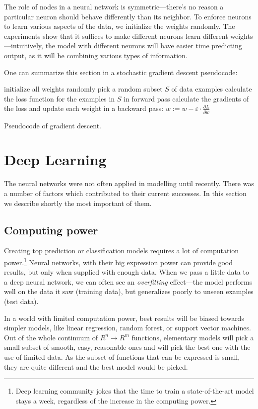 The role of nodes in a neural network is symmetric---there's no reason a particular neuron should behave differently than its neighbor. To enforce neurons to learn various aspects of the data, we initialize the weights randomly. The experiments show that it suffices to make different neurons learn different weights---intuitively, the model with different neurons will have easier time predicting output, as it will be combining various types of information.

One can summarize this section in a stochastic gradient descent pseudocode:
\begin{algorithm} \label{sgd-pseudo}
  initialize all weights randomly\;
   {
    pick a random subset $S$ of data examples\;
    calculate the loss function for the examples in $S$ in forward pass\;
    calculate the gradients of the loss and update each weight in a backward pass:
    $w := w - \varepsilon \cdot \frac{\partial L}{\partial w}$
  }
  \caption{Pseudocode of gradient descent.}
\end{algorithm}

\section{Deep Learning}
The neural networks were not often applied in modelling until recently. There was a number of factors which contributed to their current successes. In this section we describe shortly the most important of them.

\subsection{Computing power}
Creating top prediction or classification models requires a lot of computation power.\footnote{Deep learning community jokes that the time to train a state-of-the-art model stays a week, regardless of the increase in the computing power.} Neural networks, with their big expression power can provide good results, but only when supplied with enough data. When we pass a little data to a deep neural network, we can often see an \emph{overfitting} effect---the model performs well on the data it saw (training data), but generalizes poorly to unseen examples (test data).

In a world with limited computation power, best results will be biased towards simpler models, like linear regression, random forest, or support vector machines. Out of the whole continuum of $R^n \rightarrow R^m$ functions, elementary models will pick a small subset of smooth, easy, reasonable ones and will pick the best one with the use of limited data. As the subset of functions that can be expressed is small, they are quite different and the best model would be picked.

